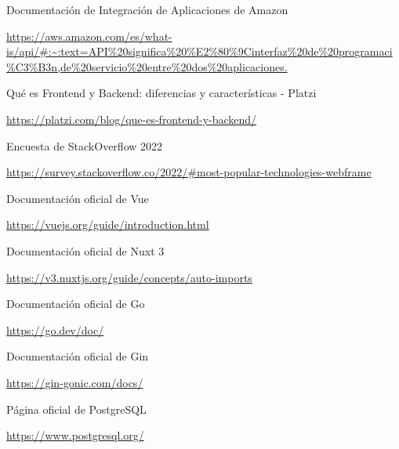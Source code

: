 \printbibliography[heading=bibintoc]
\begin{thebibliography}{X}
	 Documentación de Integración de Aplicaciones de Amazon
	
	
	\url{https://aws.amazon.com/es/what-is/api/#:~:text=API%20significa%20%E2%80%9Cinterfaz%20de%20programaci%C3%B3n,de%20servicio%20entre%20dos%20aplicaciones.}


	 Qué es Frontend y Backend: diferencias y características - Platzi
	
	\url{https://platzi.com/blog/que-es-frontend-y-backend/}
	
	 Encuesta de StackOverflow 2022
	
	
	\url{https://survey.stackoverflow.co/2022/#most-popular-technologies-webframe}
	
 Documentación oficial de Vue

\url{https://vuejs.org/guide/introduction.html}

 Documentación oficial de Nuxt 3

\url{https://v3.nuxtjs.org/guide/concepts/auto-imports}

 Documentación oficial de Go

\url{https://go.dev/doc/}

 Documentación oficial de Gin

\url{https://gin-gonic.com/docs/}

 Página oficial de PostgreSQL

\url{https://www.postgresql.org/}
	
\end{thebibliography}